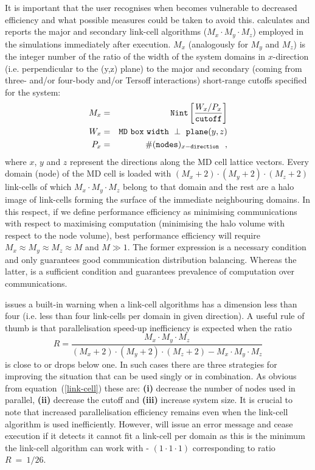 It is important that the user recognises when \D becomes
vulnerable to decreased efficiency and what possible measures
could be taken to avoid this.  \D calculates and reports the
major and secondary link-cell algorithms ($M_{x} \cdot M_{y} \cdot M_{z}$)
employed in the simulations immediately after execution.  $M_{x}$
(analogously for $M_{y}$ and $M_{z}$) is the integer number of the
ratio of the width of the system domains in $x$-direction (i.e.
perpendicular to the (y,z) plane) to the major and secondary
(coming from three- and/or four-body and/or Tersoff interactions)
short-range cutoffs specified for the system:
\begin{eqnarray}
M_{x} &=& {\tt Nint} \left[ \frac{W_{x}/P_{x}}{\tt cutoff} \right] \nonumber \\
W_{x} &=& {\tt MD~box~width~\perp~plane}(y,z) \label{link-cell} \\
P_{x} &=& \#({\tt nodes})_{x{\tt -direction}}~~, \nonumber
\end{eqnarray}
where $x$, $y$ and $z$ represent the directions along the MD cell
lattice vectors.  Every domain (node) of the MD cell is loaded with
$(M_{x}+2) \cdot (M_{y}+2) \cdot (M_{z}+2)$ link-cells of which
$M_{x} \cdot M_{y} \cdot M_{z}$ belong to that domain and the rest
are a halo image of link-cells forming the surface of the
immediate neighbouring domains.  In this respect, if we define
performance efficiency as minimising communications with respect
to maximising computation (minimising the halo volume with respect
to the node volume), best performance efficiency will require
$M_{x} \approx M_{y} \approx M_{z} \approx M$ and $M \gg 1$.
The former expression is a necessary condition and only guarantees
good communication distribution balancing.  Whereas the latter, is
a sufficient condition and guarantees prevalence of computation over
communications.

\D issues a built-in warning when a link-cell algorithms has a
dimension less than four (i.e. less than four link-cells per
domain in given direction).  A useful rule of thumb is that
parallelisation speed-up inefficiency is expected when the ratio
\begin{equation}
R = \frac{M_{x} \cdot M_{y} \cdot M_{z}}{(M_{x}+2)
\cdot (M_{y}+2) \cdot (M_{z}+2)-M_{x} \cdot M_{y} \cdot M_{z}} \label{R-factor}
\end{equation}
is close to or drops below one.  In such cases there are three
strategies for improving the situation that can be used singly or in
combination.  As obvious from equation~(\ref{link-cell}) these are:
{\bf (i)} decrease the number of nodes used in parallel, {\bf (ii)}
decrease the cutoff and {\bf (iii)} increase system size.  It is
crucial to note that increased parallelisation efficiency remains
even when the link-cell algorithm is used inefficiently.  However,
\D will issue an error message and cease execution if it detects it
cannot fit a link-cell per domain as this is the minimum the \D
link-cell algorithm can work with - $(1 \cdot 1 \cdot 1)$
corresponding to ratio $R~=~1/26$.


